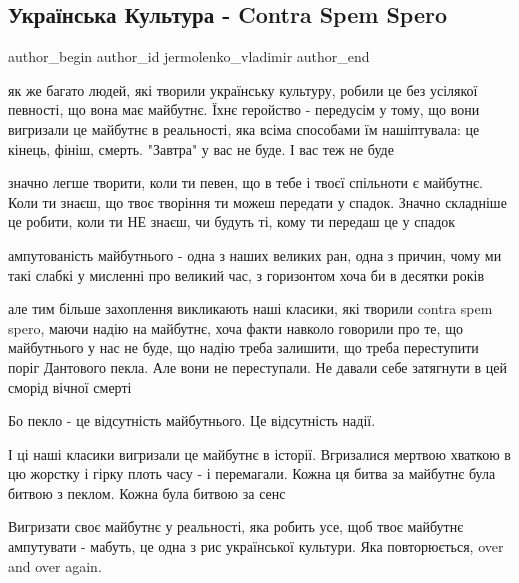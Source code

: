  
 
 
 
 
 
\subsection{Українська Культура - Contra Spem Spero}
\label{sec:25_09_2021.fb.jermolenko_vladimir.1.kultura_contra_spem_spero}
 
\ifcmt
 author_begin
   author_id jermolenko_vladimir
 author_end
\fi

як же багато людей, які творили українську культуру, робили це без усілякої
певності, що вона має майбутнє. Їхнє геройство - передусім у тому, що вони
вигризали це майбутнє в реальності, яка всіма способами їм нашіптувала: це
кінець, фініш, смерть. "Завтра" у вас не буде. І вас теж не буде

значно легше творити, коли ти певен, що в тебе і твоєї спільноти є майбутнє.
Коли ти знаєш, що твоє творіння ти можеш передати у спадок. Значно складніше це
робити, коли ти НЕ знаєш, чи будуть ті, кому ти передаш це у спадок

ампутованість майбутнього - одна з наших великих ран, одна з причин, чому ми
такі слабкі у мисленні про великий час, з горизонтом хоча би в десятки років

але тим більше захоплення викликають наші класики, які творили contra spem
spero,  маючи надію на майбутнє, хоча факти навколо говорили про те, що
майбутнього у нас не буде, що надію треба залишити, що треба переступити поріг
Дантового пекла. Але вони не переступали. Не давали себе затягнути в цей сморід
вічної смерті

Бо пекло - це відсутність майбутнього. Це відсутність надії.

І ці наші класики вигризали це майбутнє в історії. Вгризалися мертвою хваткою в
цю жорстку і гірку плоть часу - і перемагали. Кожна ця битва за майбутнє була
битвою з пеклом. Кожна була битвою за сенс

Вигризати своє майбутнє у реальності, яка робить усе, щоб твоє майбутнє
ампутувати -  мабуть, це одна з рис української культури. Яка повторюється,
over and over again.

